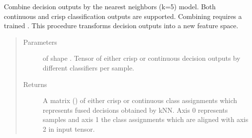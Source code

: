 \documentclass[letterpaper,10pt,english]{sphinxmanual}
\begin{document}
\begin{fulllineitems}
\begin{fulllineitems}
\begin{quote}
\begin{description}
\begin{itemize}
\end{itemize}

\end{description}\end{quote}

\end{fulllineitems}


\begin{fulllineitems}
\label{\detokenize{pusion.core.k_nearest_neighbors_combiner:pusion.core.k_nearest_neighbors_combiner.KNNCombiner.combine}}
\sphinxAtStartPar
Combine decision outputs by the  nearest neighbors (k=5) model.
Both continuous and crisp classification outputs are supported. Combining requires a trained
.
This procedure transforms decision outputs into a new feature space.
\begin{quote}\begin{description}
\item[{Parameters}] \leavevmode
\sphinxAtStartPar
{} \textendash{}  of shape .
Tensor of either crisp or continuous decision outputs by different classifiers per sample.

\item[{Returns}] \leavevmode
\sphinxAtStartPar
A matrix () of either crisp or continuous class assignments which represents fused
decisions obtained by kNN. Axis 0 represents samples and axis 1 the class
assignments which are aligned with axis 2 in  input tensor.

\end{description}\end{quote}

\end{fulllineitems}


\end{fulllineitems}

\end{document}
